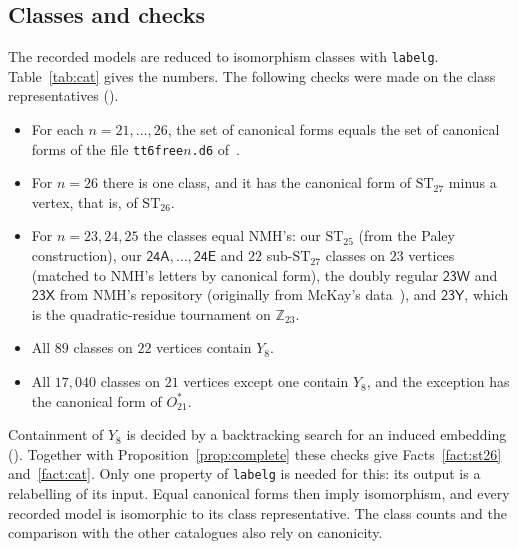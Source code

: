 \documentclass[11pt]{amsart}
\theoremstyle{definition}
\theoremstyle{remark}
\newcommand{\ST}[1]{\mathrm{ST}_{#1}}
\newcommand{\Ostar}{O_{21}^{*}}
\newcommand{\cl}[1]{\textsf{#1}}
\begin{document}
\subsection{Classes and checks}
The recorded models are reduced to isomorphism classes with \texttt{labelg}.
Table~\ref{tab:cat} gives the numbers. The following checks were made on the
class representatives ().
\begin{itemize}
\item For each $n = 21,\dots,26$, the set of canonical forms equals the set of
  canonical forms of the file \texttt{tt6free$n$.d6} of~\cite{LLHrepo}.
\item For $n=26$ there is one class, and it has the canonical form of
  $\ST{27}$ minus a vertex, that is, of $\ST{26}$.
\item For $n=23,24,25$ the classes equal NMH's: our $\ST{25}$ (from the Paley
  construction), our $\cl{24A},\dots,\cl{24E}$ and $22$ sub-$\ST{27}$ classes
  on $23$ vertices (matched to NMH's letters by canonical form), the doubly
  regular $\cl{23W}$ and $\cl{23X}$ from NMH's repository (originally from
  McKay's data~\cite{McKayDigraphs}), and $\cl{23Y}$, which is the
  quadratic-residue tournament on $\mathbb{Z}_{23}$.
\item All $89$ classes on $22$ vertices contain $Y_8$.
\item All $17{,}040$ classes on $21$ vertices except one contain $Y_8$, and the
  exception has the canonical form of $\Ostar$.
\end{itemize}
Containment of $Y_8$ is decided by a backtracking search for an induced
embedding (). Together with
Proposition~\ref{prop:complete} these checks give Facts~\ref{fact:st26}
and~\ref{fact:cat}. Only one
property of \texttt{labelg} is needed for this: its output is a relabelling
of its input. Equal canonical forms then imply isomorphism, and every recorded
model is isomorphic to its class representative. The class counts and the
comparison with the other catalogues also rely on canonicity.
\end{document}
